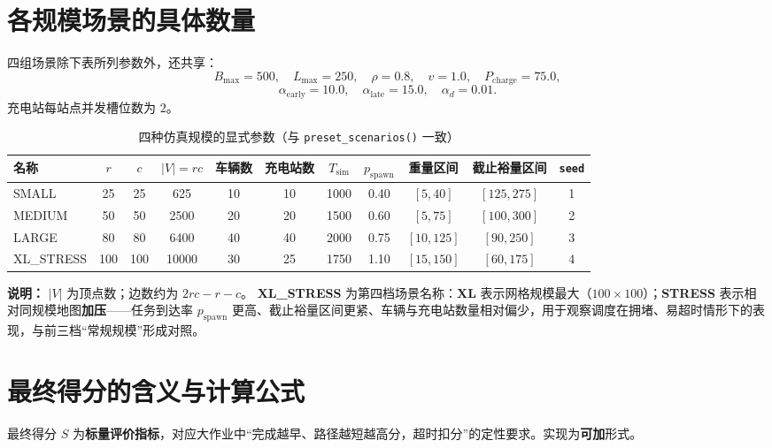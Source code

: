 \documentclass[UTF8,a4paper]{ctexart}
\begin{document}
\section{各规模场景的具体数量}

四组场景除下表所列参数外，还共享：
\[
B_{\max}=500,\quad L_{\max}=250,\quad \rho=0.8,\quad v=1.0,\quad P_{\mathrm{charge}}=75.0,
\]
\[
\alpha_{\mathrm{early}}=10.0,\quad \alpha_{\mathrm{late}}=15.0,\quad \alpha_{d}=0.01.
\]
充电站每站点并发槽位数为 $2$。

\begin{table}[htbp]
  \centering
  \caption[四种仿真规模参数]{四种仿真规模的显式参数（与 \texttt{preset\_scenarios()} 一致）}
  \small
  \begin{tabular}{@{}lcccccccccc@{}}
    \toprule
    名称 & $r$ & $c$ & $|V|=rc$ & 车辆数 & 充电站数 & $T_{\mathrm{sim}}$ &
    $p_{\mathrm{spawn}}$ & 重量区间 & 截止裕量区间 & \texttt{seed} \\
    \midrule
    SMALL      & 25 & 25 & 625   & 10 & 10 & 1000 & 0.40 & $[5,40]$   & $[125,275]$ & 1 \\
    MEDIUM     & 50 & 50 & 2500  & 20 & 20 & 1500 & 0.60 & $[5,75]$   & $[100,300]$ & 2 \\
    LARGE      & 80 & 80 & 6400  & 40 & 40 & 2000 & 0.75 & $[10,125]$ & $[90,250]$ & 3 \\
    XL\_STRESS & 100 & 100 & 10000 & 30 & 25 & 1750 & 1.10 & $[15,150]$ & $[60,175]$ & 4 \\
    \bottomrule
  \end{tabular}
\end{table}

\noindent\textbf{说明：} $|V|$ 为顶点数；边数约为 $2rc-r-c$。
\textbf{XL\_STRESS} 为第四档场景名称：\textbf{XL} 表示网格规模最大（$100\times 100$）；\textbf{STRESS} 表示相对同规模地图\textbf{加压}——任务到达率 $p_{\mathrm{spawn}}$ 更高、截止裕量区间更紧、车辆与充电站数量相对偏少，用于观察调度在拥堵、易超时情形下的表现，与前三档“常规规模”形成对照。

\section{最终得分的含义与计算公式}
\label{sec:score}

最终得分 $S$ 为\textbf{标量评价指标}，对应大作业中“完成越早、路径越短越高分，超时扣分”的定性要求。实现为\textbf{可加}形式。
\end{document}
